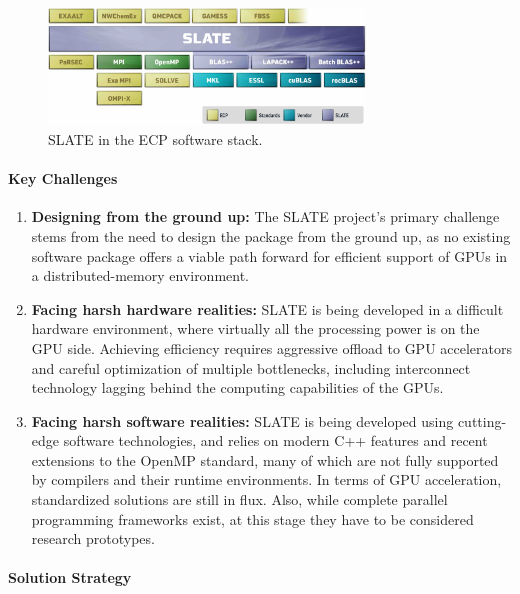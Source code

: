 \begin{figure}[htb]
    \centering
    \includegraphics[width=0.75\textwidth]{projects/2.3.3-MathLibs/2.3.3.13-CLOVER/SLATE-architecture.jpg}
    \caption{\label{fig:slate-architecture}
    SLATE in the ECP software stack.}
\end{figure}

\paragraph{Key  Challenges}

\begin{enumerate}

\item
\textbf{Designing from the ground up:}
The SLATE project's primary challenge stems from the need to design the package
from the ground up, as no existing software package offers
a viable path forward for efficient support of GPUs
in a distributed-memory environment.

\item
\textbf{Facing harsh hardware realities:}
SLATE is being developed in a difficult hardware environment, where virtually
all the processing power is on the GPU side.
Achieving efficiency requires aggressive offload to GPU accelerators
and careful optimization of multiple bottlenecks, including 
interconnect technology lagging behind the computing
capabilities of the GPUs.

\item
\textbf{Facing harsh software realities:}
SLATE is being developed using cutting-edge software technologies,
and relies on modern C++ features and recent extensions
to the OpenMP standard, many of which are not fully supported by compilers
and their runtime environments.
In terms of GPU acceleration, standardized solutions are still in flux.
Also, while complete parallel programming frameworks exist, at this stage
they have to be considered research prototypes.

\end{enumerate}

\paragraph{Solution Strategy}


